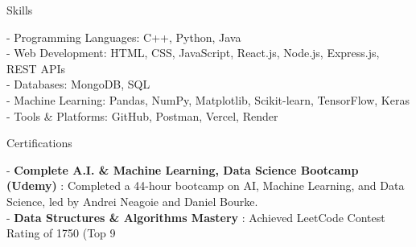 \documentclass[]{resume}
\begin{document}
\begin{rSection}{Skills}

- Programming Languages: C++, Python, Java\\

- Web Development: HTML, CSS, JavaScript, React.js, Node.js, Express.js, REST APIs\\

- Databases: MongoDB, SQL\\

- Machine Learning: Pandas, NumPy, Matplotlib, Scikit-learn, TensorFlow, Keras\\

- Tools & Platforms: GitHub, Postman, Vercel, Render\\

\end{rSection}

\begin{rSection}{Certifications}

- \textbf{ Complete A.I. & Machine Learning, Data Science Bootcamp (Udemy) }: Completed a 44-hour bootcamp on AI, Machine Learning, and Data Science, led by Andrei Neagoie and Daniel Bourke.\\

- \textbf{ Data Structures & Algorithms Mastery }: Achieved LeetCode Contest Rating of 1750 (Top 9%

\end{rSection}
\end{document}
